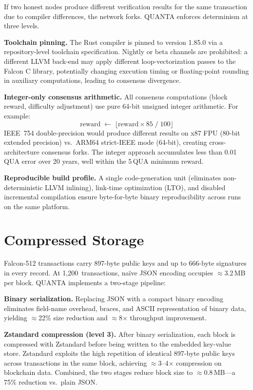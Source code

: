 \documentclass[11pt,a4paper]{article}
\begin{document}
If two honest nodes produce different verification results for the same
transaction due to compiler differences, the network forks. QUANTA enforces
determinism at three levels.

\textbf{Toolchain pinning.}
The Rust compiler is pinned to version 1.85.0 via a repository-level
toolchain specification. Nightly or beta channels are prohibited: a different
LLVM back-end may apply different loop-vectorization passes to the Falcon C
library, potentially changing execution timing or floating-point rounding in
auxiliary computations, leading to consensus divergence.

\textbf{Integer-only consensus arithmetic.}
All consensus computations (block reward, difficulty adjustment) use pure
64-bit unsigned integer arithmetic. For example:
\[
  \text{reward} \;\leftarrow\; \lfloor \text{reward} \times 85 \;/\; 100 \rfloor
\]
IEEE~754 double-precision would produce different results on x87 FPU
(80-bit extended precision) vs.\ ARM64 strict-IEEE mode (64-bit), creating
cross-architecture consensus forks. The integer approach accumulates less
than 0.01\,QUA error over 20 years, well within the 5\,QUA minimum reward.

\textbf{Reproducible build profile.}
A single code-generation unit (eliminates non-deterministic LLVM inlining),
link-time optimization (LTO), and disabled incremental compilation ensure
byte-for-byte binary reproducibility across runs on the same platform.

\section{Compressed Storage}
\label{sec:storage}

Falcon-512 transactions carry 897-byte public keys and up to 666-byte
signatures in every record. At 1,200~transactions, na\"ive JSON encoding
occupies $\approx$3.2\,MB per block. QUANTA implements a two-stage pipeline:

\textbf{Binary serialization.}
Replacing JSON with a compact binary encoding eliminates field-name overhead,
braces, and ASCII representation of binary data, yielding $\approx$22\%
size reduction and $\approx$8$\times$ throughput improvement.

\textbf{Zstandard compression (level 3).}
After binary serialization, each block is compressed with Zstandard before
being written to the embedded key-value store. Zstandard exploits the high
repetition of identical 897-byte public keys across transactions in the same
block, achieving $\approx$3--4$\times$ compression on blockchain data.
Combined, the two stages reduce block size to $\approx$0.8\,MB---a 75\%
reduction vs.\ plain JSON.
\end{document}
